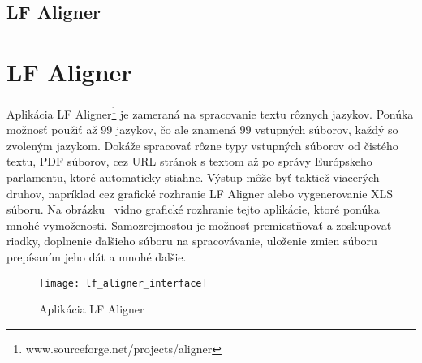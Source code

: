 %
%
{
	\subsection{LF Aligner}
}
{
	\section{LF Aligner}
}
Aplikácia LF Aligner\footnote{www.sourceforge.net/projects/aligner} je zameraná na spracovanie textu rôznych jazykov. Ponúka možnosť použiť až 99 jazykov, čo ale znamená 99 vstupných súborov, každý so zvoleným jazykom. Dokáže spracovať rôzne typy vstupných súborov od čistého textu, PDF súborov, cez URL stránok s textom až po správy Európskeho parlamentu, ktoré automaticky stiahne. Výstup môže byť taktiež viacerých druhov, napríklad cez grafické rozhranie LF Aligner alebo vygenerovanie XLS súboru. Na obrázku~ vidno grafické rozhranie tejto aplikácie, ktoré ponúka mnohé vymoženosti. Samozrejmosťou je možnosť premiestňovať a zoskupovať riadky, doplnenie ďalšieho súboru na spracovávanie, uloženie zmien súboru prepísaním jeho dát a mnohé ďalšie.

\begin{figure}[H]
	\begin{center}\texttt{[image: lf\_aligner\_interface]}\end{center}
	\caption[Aplikácia LF Aligner]{Aplikácia LF Aligner}\label{fig:lf_aligner_interface}
\end{figure}

